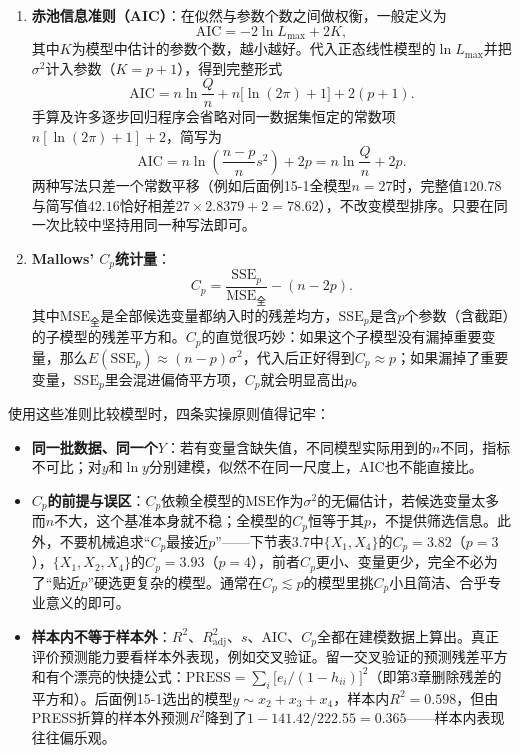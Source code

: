 \begin{enumerate}
\item \textbf{赤池信息准则（AIC）}：在似然与参数个数之间做权衡，一般定义为
\[
\mathrm{AIC}=-2\ln L_{\max}+2K,
\]
其中$K$为模型中估计的参数个数，越小越好。代入正态线性模型的$\ln L_{\max}$并把$\sigma^2$计入参数（$K=p+1$），得到完整形式
\[
\mathrm{AIC}=n\ln\frac Qn+n\bigl[\ln(2\pi)+1\bigr]+2(p+1).
\]
手算及许多逐步回归程序会省略对同一数据集恒定的常数项$n[\ln(2\pi)+1]+2$，简写为
\[
\mathrm{AIC}=n\ln\left(\frac{n-p}{n}s^2\right)+2p=n\ln\frac Qn+2p.
\]
两种写法只差一个常数平移（例如后面例15-1全模型$n=27$时，完整值$120.78$与简写值$42.16$恰好相差$27\times 2.8379+2=78.62$），不改变模型排序。只要在同一次比较中坚持用同一种写法即可。

\item \textbf{Mallows' $C_p$统计量}：
\[
C_p=\frac{\mathrm{SSE}_p}{\mathrm{MSE}_{\text{全}}}-(n-2p).
\]
其中$\mathrm{MSE}_{\text{全}}$是全部候选变量都纳入时的残差均方，$\mathrm{SSE}_p$是含$p$个参数（含截距）的子模型的残差平方和。$C_p$的直觉很巧妙：如果这个子模型没有漏掉重要变量，那么$E(\mathrm{SSE}_p)\approx (n-p)\sigma^2$，代入后正好得到$C_p\approx p$；如果漏掉了重要变量，$\mathrm{SSE}_p$里会混进偏倚平方项，$C_p$就会明显高出$p$。
\end{enumerate}

使用这些准则比较模型时，四条实操原则值得记牢：
\begin{itemize}
\item \textbf{同一批数据、同一个$Y$}：若有变量含缺失值，不同模型实际用到的$n$不同，指标不可比；对$y$和$\ln y$分别建模，似然不在同一尺度上，AIC也不能直接比。
\item \textbf{$C_p$的前提与误区}：$C_p$依赖全模型的$\mathrm{MSE}$作为$\sigma^2$的无偏估计，若候选变量太多而$n$不大，这个基准本身就不稳；全模型的$C_p$恒等于其$p$，不提供筛选信息。此外，不要机械追求“$C_p$最接近$p$”——下节表3.7中$\{X_1,X_4\}$的$C_p=3.82$（$p=3$），$\{X_1,X_2,X_4\}$的$C_p=3.93$（$p=4$），前者$C_p$更小、变量更少，完全不必为了“贴近$p$”硬选更复杂的模型。通常在$C_p\lesssim p$的模型里挑$C_p$小且简洁、合乎专业意义的即可。
\item \textbf{样本内不等于样本外}：$R^2$、$R_{\mathrm{adj}}^2$、$s$、AIC、$C_p$全都在建模数据上算出。真正评价预测能力要看样本外表现，例如交叉验证。留一交叉验证的预测残差平方和有个漂亮的快捷公式：$\mathrm{PRESS}=\sum_i\bigl[e_i/(1-h_{ii})\bigr]^2$（即第3章删除残差的平方和）。后面例15-1选出的模型$y\sim x_2+x_3+x_4$，样本内$R^2=0.598$，但由PRESS折算的样本外预测$R^2$降到了$1-141.42/222.55=0.365$——样本内表现往往偏乐观。
\end{itemize}


